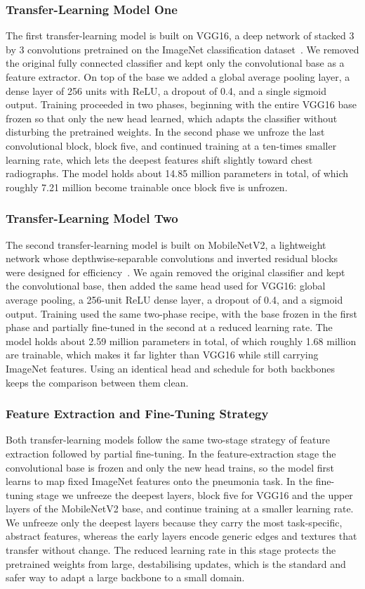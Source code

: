 \documentclass[preprint,12pt]{elsarticle}
\begin{document}
\subsubsection{Transfer-Learning Model One}
The first transfer-learning model is built on VGG16, a deep network of stacked 3 by 3 convolutions pretrained on the ImageNet classification dataset~\cite{simonyan2015very}.
We removed the original fully connected classifier and kept only the convolutional base as a feature extractor.
On top of the base we added a global average pooling layer, a dense layer of 256 units with ReLU, a dropout of 0.4, and a single sigmoid output.
Training proceeded in two phases, beginning with the entire VGG16 base frozen so that only the new head learned, which adapts the classifier without disturbing the pretrained weights.
In the second phase we unfroze the last convolutional block, block five, and continued training at a ten-times smaller learning rate, which lets the deepest features shift slightly toward chest radiographs.
The model holds about 14.85 million parameters in total, of which roughly 7.21 million become trainable once block five is unfrozen.

\subsubsection{Transfer-Learning Model Two}
The second transfer-learning model is built on MobileNetV2, a lightweight network whose depthwise-separable convolutions and inverted residual blocks were designed for efficiency~\cite{sandler2018mobilenetv2}.
We again removed the original classifier and kept the convolutional base, then added the same head used for VGG16: global average pooling, a 256-unit ReLU dense layer, a dropout of 0.4, and a sigmoid output.
Training used the same two-phase recipe, with the base frozen in the first phase and partially fine-tuned in the second at a reduced learning rate.
The model holds about 2.59 million parameters in total, of which roughly 1.68 million are trainable, which makes it far lighter than VGG16 while still carrying ImageNet features.
Using an identical head and schedule for both backbones keeps the comparison between them clean.

\subsubsection{Feature Extraction and Fine-Tuning Strategy}
Both transfer-learning models follow the same two-stage strategy of feature extraction followed by partial fine-tuning.
In the feature-extraction stage the convolutional base is frozen and only the new head trains, so the model first learns to map fixed ImageNet features onto the pneumonia task.
In the fine-tuning stage we unfreeze the deepest layers, block five for VGG16 and the upper layers of the MobileNetV2 base, and continue training at a smaller learning rate.
We unfreeze only the deepest layers because they carry the most task-specific, abstract features, whereas the early layers encode generic edges and textures that transfer without change.
The reduced learning rate in this stage protects the pretrained weights from large, destabilising updates, which is the standard and safer way to adapt a large backbone to a small domain.
\end{document}
